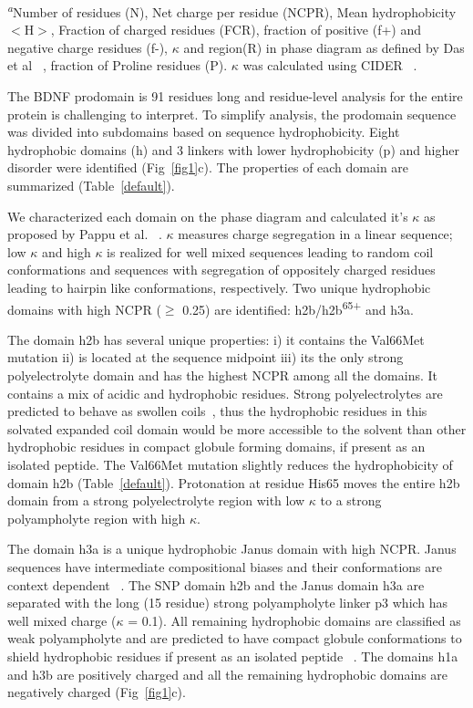 \documentclass[journal=jacsat,manuscript=article]{achemso}
\begin{document}
\begin{table}[ht]
\textsuperscript{\emph{a}}Number of residues (N), Net charge per residue (NCPR), Mean hydrophobicity  $<$H$>$, Fraction of charged residues (FCR), fraction of positive (f+) and negative charge residues (f-), $\kappa$ and region(R) in phase diagram as defined by Das et al ~\cite {Das2013a}, fraction of Proline residues (P). $\kappa$ was calculated using CIDER ~\cite {Holehouse2017}.


\label{default}

\end{table}
The BDNF prodomain is 91 residues long and residue-level analysis for the entire protein is challenging to interpret. To simplify analysis, the prodomain sequence was divided into subdomains based on sequence hydrophobicity. Eight hydrophobic domains (h) and 3 linkers with lower hydrophobicity (p) and higher disorder were identified (Fig~\ref{fig1}c). The properties of each domain are summarized (Table~\ref{default}).  

We characterized each domain on the phase diagram and calculated it's $\kappa$ as proposed by Pappu et al. ~\cite {Mao2010a,Das2013a}.  $\kappa$ measures charge segregation in a linear sequence; low $\kappa$ and high $\kappa$ is realized for well mixed sequences leading to random coil conformations and sequences with segregation of oppositely charged residues leading to hairpin like conformations, respectively. Two unique hydrophobic domains with high NCPR ($\geq$ 0.25) are identified: h2b/h2b\textsuperscript{65+} and h3a. 

The domain h2b has several unique properties: i) it contains the Val66Met mutation ii) is located at the sequence midpoint iii) its the only strong polyelectrolyte domain and has the highest NCPR among all the domains. It contains a mix of acidic and hydrophobic residues. Strong polyelectrolytes are predicted to behave as swollen coils~\cite {Das2013a}, thus the hydrophobic residues in this solvated expanded coil domain would be more accessible to the solvent than other hydrophobic residues in compact globule forming domains, if present as an isolated peptide. The Val66Met mutation slightly reduces the hydrophobicity of domain h2b (Table~\ref{default}). Protonation at residue His65 moves the entire h2b domain from a strong polyelectrolyte region with low $\kappa$ to a strong polyampholyte region with high $\kappa$.

The domain h3a is a unique hydrophobic Janus domain with high NCPR. Janus sequences have intermediate compositional biases and their conformations are context dependent ~\cite{Das2015b}. The SNP domain h2b and the Janus domain h3a are separated with the long (15 residue) strong polyampholyte linker p3 which has well mixed charge ($\kappa$ = 0.1). All remaining hydrophobic domains are classified as weak polyampholyte and are predicted to have compact globule conformations to shield hydrophobic residues if present as an isolated peptide ~\cite {Das2015b}. The domains h1a and h3b are positively charged and all the remaining hydrophobic domains are negatively charged (Fig~\ref{fig1}c).
\end{document}
